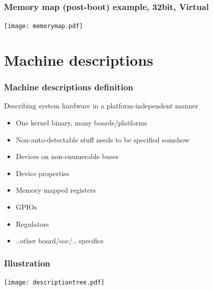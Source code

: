 \documentclass{beamer}
\begin{document}
\begin{frame}
\frametitle{Memory map (post-boot) example, 32bit, Virtual}
\begin{center}
\texttt{[image: memorymap.pdf]}
\end{center}
\end{frame}
\section{Machine descriptions}

\begin{frame}
\frametitle{Machine descriptions definition}
Describing system hardware in a platform-independent manner
\begin{itemize}
	\item One kernel binary, many boards/platforms
	\item Non-auto-detectable stuff needs to be specified somehow
	\item Devices on non-enumerable buses
	\item Device properties
	\item Memory mapped registers
	\item GPIOs
	\item Regulators
	\item ..other board/soc/.. specifics
\end{itemize}
\end{frame}

\begin{frame}
\frametitle{Illustration}
\begin{center}
\texttt{[image: descriptiontree.pdf]}
\end{center}
\end{frame}
\end{document}
